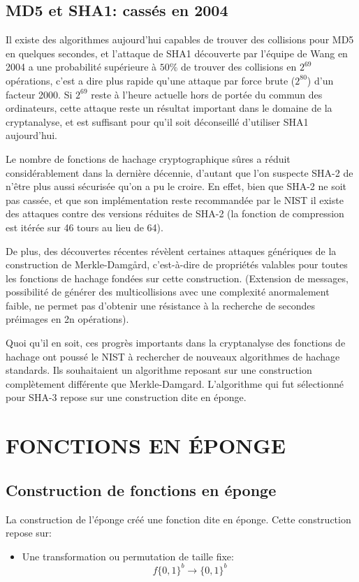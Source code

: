 \documentclass[10.5pt, a4paper, twoside, openright]{report}
\begin{document}
\section{MD5 et SHA1: cassés en 2004}
Il existe des algorithmes aujourd’hui capables de trouver des collisions pour MD5 en quelques secondes, et l’attaque de SHA1 découverte par l’équipe de Wang en 2004 a une probabilité supérieure à $50\%$ de trouver des collisions en $2^{69}$ opérations, c’est a dire plus rapide qu’une attaque par force brute ($2^80$) d’un facteur 2000.
Si $2^{69}$ reste à l’heure actuelle hors de portée du commun des ordinateurs, cette attaque reste un résultat important dans le domaine de la cryptanalyse, et est suffisant pour qu’il soit déconseillé d’utiliser SHA1 aujourd’hui.

Le nombre de fonctions de hachage cryptographique sûres a réduit considérablement dans la dernière décennie, d’autant que l’on suspecte SHA-2 de n’être plus aussi sécurisée qu’on a pu le croire. En effet, bien que SHA-2 ne soit pas cassée, et que son implémentation reste recommandée par le NIST il existe des attaques contre des versions réduites de SHA-2 (la fonction de compression est itérée sur 46 tours au lieu de 64).

De plus, des découvertes récentes révèlent certaines attaques génériques de la construction de Merkle-Damg\r{a}rd, c’est-à-dire de propriétés valables pour toutes les fonctions de hachage fondées sur cette construction.
(Extension de messages, possibilité de générer des multicollisions avec une complexité anormalement faible, ne permet pas d’obtenir une résistance à la recherche de secondes préimages en 2n opérations).

Quoi qu'il en soit, ces progrès importants dans la cryptanalyse des fonctions de hachage ont poussé le NIST à rechercher de nouveaux algorithmes de hachage standards. Ils souhaitaient un algorithme reposant sur une construction complètement différente que Merkle-Damgard. L'algorithme qui fut sélectionné pour SHA-3 repose sur une construction dite en éponge. 

\chapter{FONCTIONS EN ÉPONGE}
\section{Construction de fonctions en éponge}
La construction de l'éponge créé une fonction dite en éponge. Cette construction repose sur:
\begin{itemize}
\item{Une transformation ou permutation de taille fixe:
$$f{\{0,1\}}^b \rightarrow {\{0,1\}}^b$$}
\end{itemize}
\end{document}
